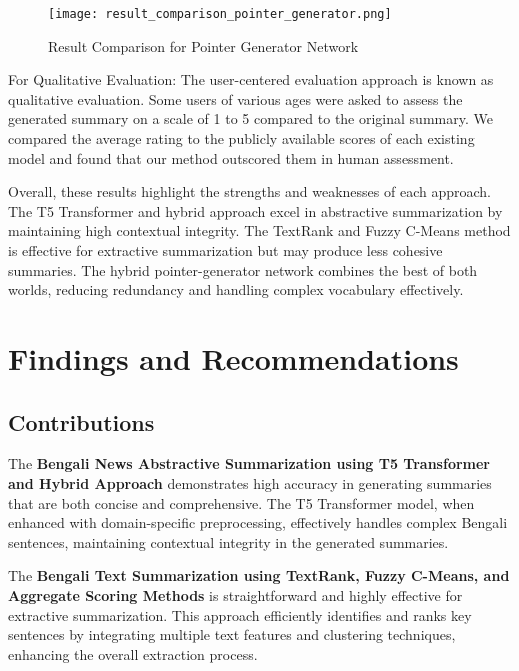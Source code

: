 \documentclass[12pt]{report}
\begin{document}
\begin{figure}[H]
    \centering
    \texttt{[image: result\_comparison\_pointer\_generator.png]}
    \caption{Result Comparison for Pointer Generator Network \cite{dhar2021pointer}}
    \label{fig:pointer_generator_result}
\end{figure}

For Qualitative Evaluation: The user-centered evaluation approach is known as qualitative evaluation. Some users of various ages were asked to assess the generated summary on a scale of 1 to 5 compared to the original summary. We compared the average rating to the publicly available scores of each existing model and found that our method outscored them in human assessment.

Overall, these results highlight the strengths and weaknesses of each approach. The T5 Transformer and hybrid approach excel in abstractive summarization by maintaining high contextual integrity. The TextRank and Fuzzy C-Means method is effective for extractive summarization but may produce less cohesive summaries. The hybrid pointer-generator network combines the best of both worlds, reducing redundancy and handling complex vocabulary effectively.

\section*{Findings and Recommendations}

\subsection*{Contributions}
The \textbf{Bengali News Abstractive Summarization using T5 Transformer and Hybrid Approach} \cite{hasib2023bengali} demonstrates high accuracy in generating summaries that are both concise and comprehensive. The T5 Transformer model, when enhanced with domain-specific preprocessing, effectively handles complex Bengali sentences, maintaining contextual integrity in the generated summaries.

The \textbf{Bengali Text Summarization using TextRank, Fuzzy C-Means, and Aggregate Scoring Methods} \cite{rahman2019bengali} is straightforward and highly effective for extractive summarization. This approach efficiently identifies and ranks key sentences by integrating multiple text features and clustering techniques, enhancing the overall extraction process.
\end{document}
